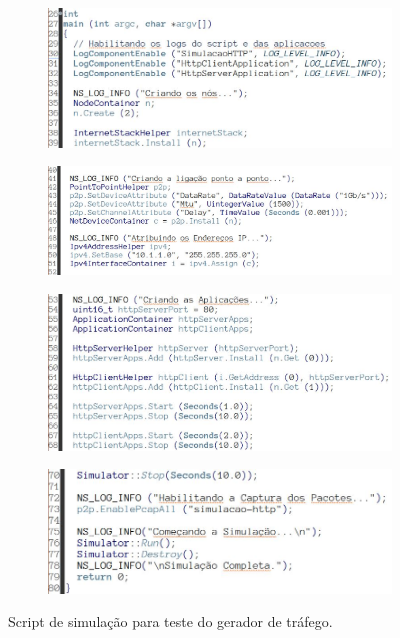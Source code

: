 \begin{figure}[!h]
	\centering
	\begin{subfigure}{\textwidth}
		\centering
		\includegraphics[width=0.7\linewidth]{textuais/script-simulação-1.jpg}
		\caption{}
	\end{subfigure}
	\begin{subfigure}{\textwidth}
		\centering
		\includegraphics[width=0.7\linewidth]{textuais/script-simulação-2.jpg}
		\caption{}
	\end{subfigure}
	\begin{subfigure}{\textwidth}
		\centering
		\includegraphics[width=0.7\linewidth]{textuais/script-simulação-3.jpg}
		\caption{}
	\end{subfigure}
	\begin{subfigure}{\textwidth}
		\centering
		\includegraphics[width=0.7\linewidth]{textuais/script-simulação-4.jpg}
		\caption{}
	\end{subfigure}
	\caption{Script de simulação para teste do gerador de tráfego.}
	\label{fig:script-simulação}
\end{figure}


